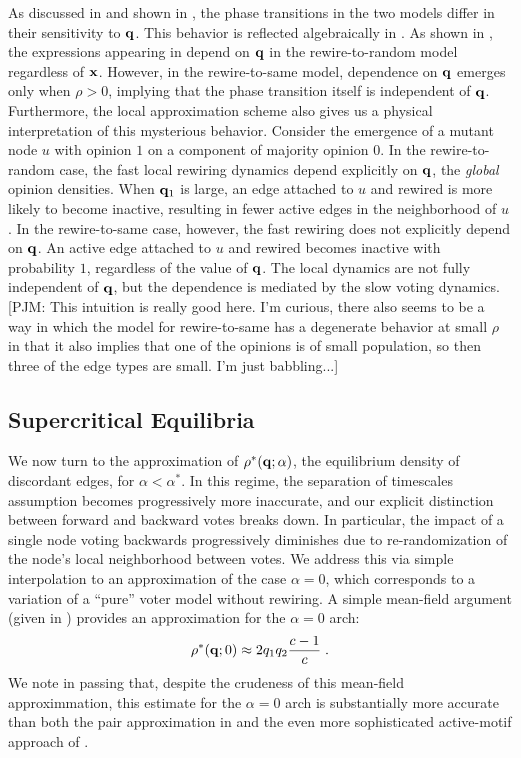 \documentclass[review, onefignum, onetabnum]{siamart171218}
\newcommand{\pjm}[1]{{\color{blue}[PJM: #1]}}
\begin{document}
		As discussed in \cite{Durrett2012} and shown in , the phase transitions in the two models differ in their sensitivity to $\mathbf{q}$. 
		This behavior is reflected algebraically in .
		As shown in , the expressions appearing in  depend on $\mathbf{q}$ in the rewire-to-random model regardless of $\mathbf{x}$. 
		However,  in the rewire-to-same model, dependence on $\mathbf{q}$ emerges only when $\rho > 0$, implying that the phase transition itself is independent of $\mathbf{q}$. 
		Furthermore, the local approximation scheme also gives us a physical interpretation of this mysterious behavior. 
		Consider the emergence of a mutant node $u$ with opinion $1$ on a component of majority opinion $0$. 
		In the rewire-to-random case, the fast local rewiring dynamics depend explicitly on $\mathbf{q}$, the \emph{global} opinion densities. 
		When $\mathbf{q}_1$ is large, an edge attached to $u$ and rewired is more likely to become inactive, resulting in fewer active edges in the neighborhood of $u$. 
		In the rewire-to-same case, however, the fast rewiring does not explicitly depend on $\mathbf{q}$. 
		An active edge attached to $u$ and rewired becomes inactive with probability $1$, regardless of the value of $\mathbf{q}$. 
		The local dynamics are not fully independent of $\mathbf{q}$, but the dependence is mediated by the slow voting dynamics. 
		 \pjm{This intuition is really good here. I'm curious, there also seems to be a way in which the model for rewire-to-same has a degenerate behavior at small $\rho$ in that it also implies that one of the opinions is of small population, so then three of the edge types are small. I'm just babbling...}
	
	\subsection{Supercritical Equilibria}
		
		We now turn to the approximation of $\rho^*(\mathbf{q};\alpha)$, the equilibrium density of discordant edges, for $\alpha < \alpha^*$. 
		In this regime, the separation of timescales assumption becomes progressively more inaccurate, and our explicit distinction between forward and backward votes breaks down. 
		In particular, the impact of a single node voting backwards progressively diminishes due to re-randomization of the node's local neighborhood between votes. 
		We address this via simple interpolation to an approximation of the case $\alpha = 0$, which corresponds to a variation of a ``pure'' voter model without rewiring. 
		A simple mean-field argument (given in ) provides an approximation for the $\alpha = 0$ arch:
		\begin{align}
			\rho^*(\q; 0) \approx 2q_1q_2\frac{c-1}{c}\;. \label{eq:alpha_0}
		\end{align}
		We note in passing that, despite the crudeness of this mean-field approximmation, this estimate for the $\alpha = 0$ arch is substantially more accurate than both the pair approximation in \cite{Durrett2012} and the even more sophisticated active-motif approach of \cite{Demirel2012}. 
\end{document}
